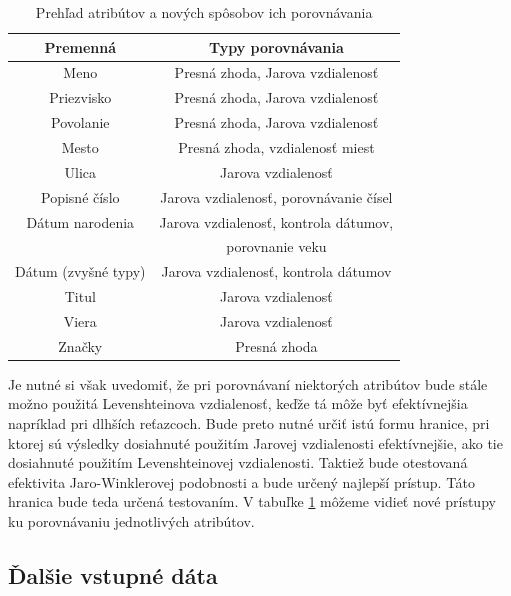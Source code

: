 \begin {table}[ht]
\begin{center}
\begin{tabular}{ |c|c|} 
\hline
Premenná               & Typy porovnávania \\
\hline
 Meno                  & Presná zhoda, Jarova vzdialenosť      \\
 Priezvisko            & Presná zhoda, Jarova vzdialenosť      \\
 Povolanie             & Presná zhoda, Jarova vzdialenosť      \\
 Mesto                  & Presná zhoda, vzdialenosť miest    \\
 Ulica                 & Jarova vzdialenosť\\
 Popisné číslo         & Jarova vzdialenosť, porovnávanie čísel  \\
 Dátum narodenia       & Jarova vzdialenosť, kontrola dátumov,\\
                                     &  porovnanie veku\\
 Dátum (zvyšné typy)   & Jarova vzdialenosť, kontrola dátumov \\
 Titul                 & Jarova vzdialenosť \\
 Viera                 & Jarova vzdialenosť \\
 Značky                & Presná zhoda   \\
\hline
\end{tabular}
\caption {Prehľad atribútov a nových spôsobov ich porovnávania} \label{porovavanie_nove}
\end{center}
\end {table}

Je nutné si však uvedomiť, že pri porovnávaní niektorých atribútov bude stále možno použitá
Levenshteinova vzdialenosť, keďže tá môže byť efektívnejšia napríklad pri dlhších
reťazcoch. Bude preto nutné určiť istú formu hranice, pri ktorej sú výsledky dosiahnuté
použitím Jarovej vzdialenosti efektívnejšie, ako tie dosiahnuté použitím Levenshteinovej
vzdialenosti. Taktiež bude otestovaná efektivita Jaro-Winklerovej podobnosti a bude určený
najlepší prístup. Táto hranica bude teda určená testovaním. V tabuľke \ref{porovavanie_nove} môžeme vidieť
nové prístupy ku porovnávaniu jednotlivých atribútov.

\subsection{Ďalšie vstupné dáta}

